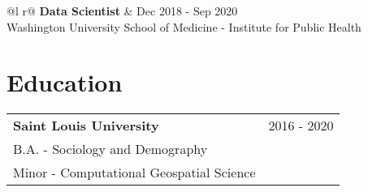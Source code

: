\documentclass[a4paper,12pt]{article}
\begin{document}
\begin{tabularx}{\linewidth}{ @{}l r@{} }
\textbf{Data Scientist} & \hfill Dec 2018 - Sep 2020 \\[3.75pt]
Washington University School of Medicine - Institute for Public Health \\ [5pt]
\end{tabularx}

\section{Education}
\begin{tabularx}{\linewidth}{@{}l X@{}}	

\textbf{Saint Louis University} & \hfill 2016 - 2020 \\
B.A. - Sociology and Demography \\
Minor - Computational Geospatial Science \\
\end{tabularx}


\end{document}
